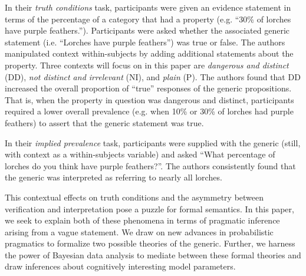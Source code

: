 \documentclass[10pt,letterpaper]{article}
\begin{document}
In their \emph{truth conditions} task, participants were given an evidence statement in terms of the percentage of a category that had a property (e.g. ``30\% of lorches have purple feathers.''). Participants were asked whether the associated generic statement (i.e. ``Lorches have purple feathers'') was true or false. The authors manipulated context within-subjects by adding additional statements about the property. Three contexts will focus on in this paper are \emph{dangerous and distinct} (DD), \emph{not distinct and irrelevant} (NI), and \emph{plain} (P). The authors found that DD increased the overall proportion of ``true'' responses of the generic propositions. That is, when the property in question was dangerous and distinct, participants required a lower overall prevalence (e.g. when 10\% or 30\% of lorches had purple feathers) to assert that the generic statement was true.

In their \emph{implied prevalence} task, participants were supplied with the generic (still, with context as a within-subjects variable) and asked ``What percentage of lorches do you think have purple feathers?''. The authors consistently found that the generic was interpreted as referring to nearly all lorches. 

This contextual effects on truth conditions and the asymmetry between verification and interpretation pose a puzzle for formal semantics. In this paper, we seek to explain both of these phenomena in terms of pragmatic inference arising from a vague statement. We draw on new advances in probabilistic pragmatics to formalize two possible theories of the generic. Further, we harness the power of Bayesian data analysis to mediate between these formal theories and draw inferences about cognitively interesting model parameters. 



\end{document}
